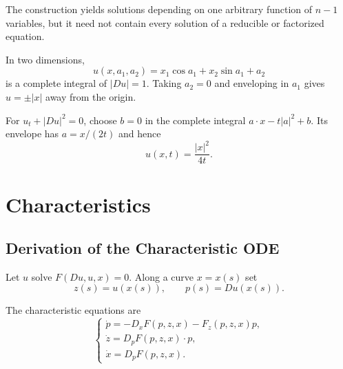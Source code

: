 \begin{remark}
\label{rem:general-integral-remarks}
The construction yields solutions depending on one arbitrary function of
$n-1$ variables, but it need not contain every solution of a reducible or
factorized equation.
\end{remark}

\begin{example}
\label{ex:eikonal-alternative-complete-integral}
In two dimensions,
\[
u(x,a_1,a_2)=x_1\cos a_1+x_2\sin a_1+a_2
\]
is a complete integral of $|Du|=1$. Taking $a_2=0$ and enveloping in $a_1$
gives $u=\pm|x|$ away from the origin.
\end{example}

\begin{example}
\label{ex:hamilton-jacobi-envelope-example}
For $u_t+|Du|^2=0$, choose $b=0$ in the complete integral
$a\cdot x-t|a|^2+b$. Its envelope has $a=x/(2t)$ and hence
\[
u(x,t)=\frac{|x|^2}{4t}.
\]
\end{example}

\section{Characteristics}
\label{sec:characteristics}

\subsection{Derivation of the Characteristic ODE}
\label{sec:characteristic-ode-derivation}

Let $u$ solve $F(Du,u,x)=0$. Along a curve $x=x(s)$ set
\[
z(s)=u(x(s)),\qquad p(s)=Du(x(s)).
\]

\begin{theorem}
\label{thm:characteristic-ode-structure}
The characteristic equations are
\[
\begin{cases}
\dot p=-D_xF(p,z,x)-F_z(p,z,x)p,\\
\dot z=D_pF(p,z,x)\cdot p,\\
\dot x=D_pF(p,z,x).
\end{cases}
\]
\end{theorem}

